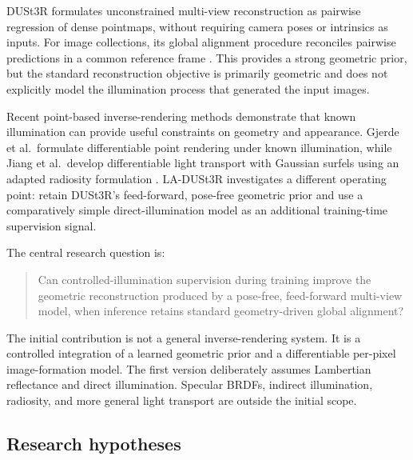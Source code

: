 \documentclass[11pt,a4paper]{article}
\begin{document}
DUSt3R formulates unconstrained multi-view reconstruction as pairwise
regression of dense pointmaps, without requiring camera poses or intrinsics
as inputs. For image collections, its global alignment procedure reconciles
pairwise predictions in a common reference frame
\cite{wang2024dust3r}. This provides a strong geometric prior, but the
standard reconstruction objective is primarily geometric and does not
explicitly model the illumination process that generated the input images.

Recent point-based inverse-rendering methods demonstrate that known
illumination can provide useful constraints on geometry and appearance.
Gjerde et al.\ formulate differentiable point rendering under known
illumination, while Jiang et al.\ develop differentiable light transport
with Gaussian surfels using an adapted radiosity formulation
\cite{gjerde2026point,jiang2025radiositygs}. LA-DUSt3R investigates a
different operating point: retain DUSt3R's feed-forward, pose-free geometric
prior and use a comparatively simple direct-illumination model as an
additional training-time supervision signal.

The central research question is:

\begin{quote}
Can controlled-illumination supervision during training improve the
geometric reconstruction produced by a pose-free, feed-forward multi-view
model, when inference retains standard geometry-driven global alignment?
\end{quote}

The initial contribution is not a general inverse-rendering system. It is a
controlled integration of a learned geometric prior and a differentiable
per-pixel image-formation model. The first version deliberately assumes
Lambertian reflectance and direct illumination. Specular BRDFs, indirect
illumination, radiosity, and more general light transport are outside the
initial scope.

\subsection{Research hypotheses}
\end{document}
